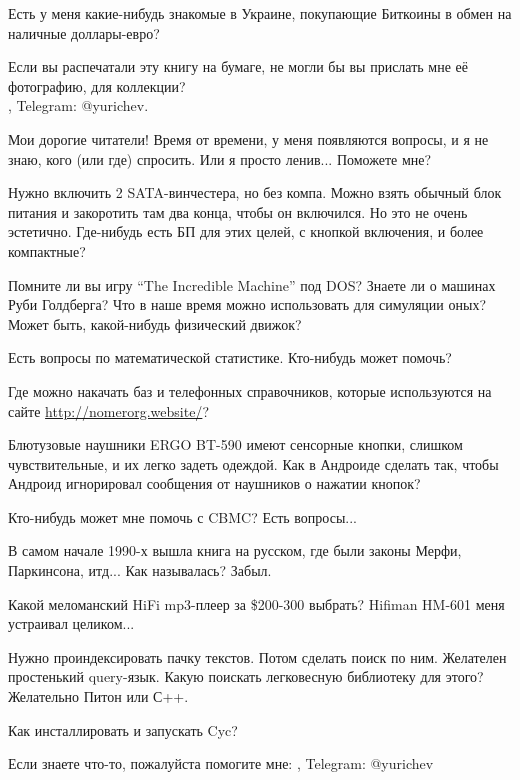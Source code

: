 \myhrule{}

Есть у меня какие-нибудь знакомые в Украине, покупающие Биткоины в обмен на наличные доллары-евро?

\myhrule{}

Если вы распечатали эту книгу на бумаге, не могли бы вы прислать мне её фотографию, для коллекции?\\
\EMAIL{}, Telegram: @yurichev.

\myhrule{}

Мои дорогие читатели! Время от времени, у меня появляются вопросы, и я не знаю, кого (или где) спросить.
Или я просто ленив...
Поможете мне?

\myhrule{}

Нужно включить 2 SATA-винчестера, но без компа.
Можно взять обычный блок питания и закоротить там два конца, чтобы он включился.
Но это не очень эстетично.
Где-нибудь есть БП для этих целей, с кнопкой включения, и более компактные?

\myhrule{}

Помните ли вы игру ``The Incredible Machine'' под DOS?
Знаете ли о машинах Руби Голдберга?
Что в наше время можно использовать для симуляции оных?
Может быть, какой-нибудь физический движок?

\myhrule{}

Есть вопросы по математической статистике. Кто-нибудь может помочь?

\myhrule{}

Где можно накачать баз и телефонных справочников, которые используются на сайте \url{http://nomerorg.website/}?

\myhrule{}

Блютузовые наушники ERGO BT-590 имеют сенсорные кнопки, слишком чувствительные, и их легко задеть одеждой.
Как в Андроиде сделать так, чтобы Андроид игнорировал сообщения от наушников о нажатии кнопок?

\myhrule{}

Кто-нибудь может мне помочь с CBMC? Есть вопросы...

\myhrule{}

В самом начале 1990-х вышла книга на русском, где были законы Мерфи, Паркинсона, итд...
Как называлась?
Забыл.

\myhrule{}

Какой меломанский HiFi mp3-плеер за \$200-300 выбрать?
Hifiman HM-601 меня устраивал целиком...

\myhrule{}

Нужно проиндексировать пачку текстов. Потом сделать поиск по ним. Желателен простенький query-язык.
Какую поискать легковесную библиотеку для этого?
Желательно Питон или С++.

\myhrule{}

Как инсталлировать и запускать Cyc?

\myhrule{}

Если знаете что-то, пожалуйста помогите мне: \EMAIL{}, Telegram: @yurichev
